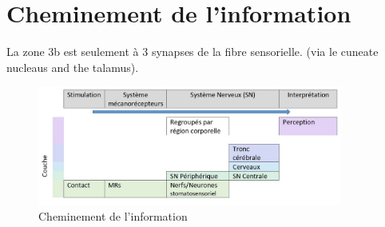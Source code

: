 \section{Cheminement de l’information}
La zone 3b est seulement à 3 synapses de la fibre sensorielle. (via le cuneate nucleaus and the talamus).\par
\begin{figure}[!h]
	\centering
	\includegraphics[width=10cm]{1_Bible/Photos/Biology/chemin.jpg}
	\caption{Cheminement de l’information}\label{chemin_info}
\end{figure}


